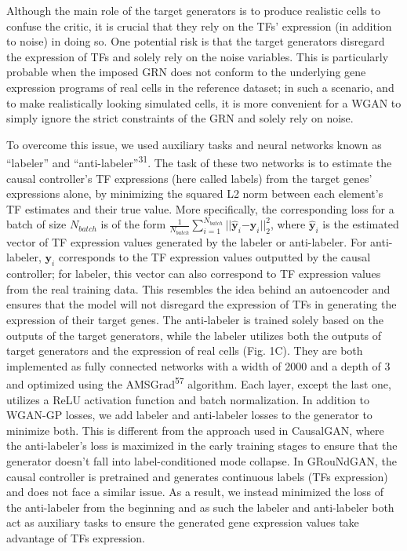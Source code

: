 Although the main role of the target generators is to produce realistic cells to confuse the critic, it is crucial that they rely on the TFs’ expression (in addition to noise) in doing so. One potential risk is that the target generators disregard the expression of TFs and solely rely on the noise variables. This is particularly probable when the imposed GRN does not conform to the underlying gene expression programs of real cells in the reference dataset; in such a scenario, and to make realistically looking simulated cells, it is more convenient for a WGAN to simply ignore the strict constraints of the GRN and solely rely on noise.

To overcome this issue, we used auxiliary tasks and neural networks known as “labeler” and “anti-labeler”\textsuperscript{31}. The task of these two networks is to estimate the causal controller’s TF expressions (here called labels) from the target genes’ expressions alone, by minimizing the squared L2 norm between each element’s TF estimates and their true value. More specifically, the corresponding loss for a batch of size $N_{batch}$ is of the form $\frac{1}{{N}_{{batch}}}{\sum }_{i=1}^{{N}_{{batch}}}{||}{\hat{{{{{\boldsymbol{y }}}}}}}_{i}{{{{\boldsymbol{-}}}}}{{{{{\boldsymbol{y }}}}}}_{i}{{||}}_{2}^{2}$, where ${\hat{{{{{\boldsymbol{y}}}}}}}_{i}$ is the estimated vector of TF expression values generated by the labeler or anti-labeler. For anti-labeler, ${{{{{\boldsymbol{y}}}}}}_{i}$ corresponds to the TF expression values outputted by the causal controller; for labeler, this vector can also correspond to TF expression values from the real training data. This resembles the idea behind an autoencoder and ensures that the model will not disregard the expression of TFs in generating the expression of their target genes. The anti-labeler is trained solely based on the outputs of the target generators, while the labeler utilizes both the outputs of target generators and the expression of real cells (Fig. 1C). They are both implemented as fully connected networks with a width of 2000 and a depth of 3 and optimized using the AMSGrad\textsuperscript{57} algorithm. Each layer, except the last one, utilizes a ReLU activation function and batch normalization. In addition to WGAN-GP losses, we add labeler and anti-labeler losses to the generator to minimize both. This is different from the approach used in CausalGAN, where the anti-labeler’s loss is maximized in the early training stages to ensure that the generator doesn’t fall into label-conditioned mode collapse. In GRouNdGAN, the causal controller is pretrained and generates continuous labels (TFs expression) and does not face a similar issue. As a result, we instead minimized the loss of the anti-labeler from the beginning and as such the labeler and anti-labeler both act as auxiliary tasks to ensure the generated gene expression values take advantage of TFs expression.

